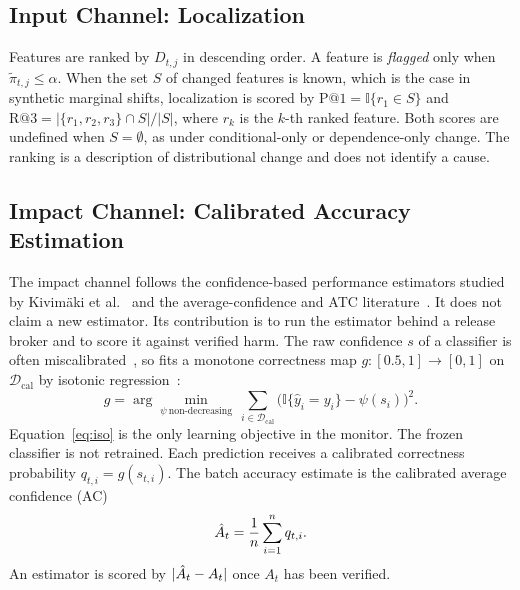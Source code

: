 \subsection{Input Channel: Localization}
Features are ranked by $D_{t,j}$ in descending order. A feature is \emph{flagged}
only when $\tilde{\pi}_{t,j}\le\alpha$. When the set $S$ of changed features is known,
which is the case in synthetic marginal shifts, localization is scored by
$\mathrm{P@1}=\mathbb{I}\{r_1\in S\}$ and
$\mathrm{R@3}=|\{r_1,r_2,r_3\}\cap S|/|S|$, where $r_k$ is the $k$-th ranked
feature. Both scores are undefined when $S=\emptyset$, as under conditional-only or
dependence-only change. The ranking is a description of distributional change and
does not identify a cause.

\subsection{Impact Channel: Calibrated Accuracy Estimation}
\label{sec:impact}
The impact channel follows the confidence-based performance estimators studied by
Kivim\"aki et al.~\cite{kivimaki2025confidence} and the average-confidence and ATC
literature~\cite{garg2022atc,guillory2021predicting}. It does not claim a new
estimator. Its contribution is to run the estimator behind a release broker and to
score it against verified harm. The raw confidence $s$ of a classifier is often
miscalibrated~\cite{guo2017calibration}, so \idm{} fits a monotone correctness map
$g:[0.5,1]\rightarrow[0,1]$ on $\mathcal{D}_{\mathrm{cal}}$ by isotonic
regression~\cite{zadrozny2002transforming}:
\begin{equation}
g=\arg\min_{\psi\ \text{non-decreasing}}\ \sum_{i\in\mathcal{D}_{\mathrm{cal}}}
\bigl(\mathbb{I}\{\hat{y}_i=y_i\}-\psi(s_i)\bigr)^{2}.
\label{eq:iso}
\end{equation}
Equation~\eqref{eq:iso} is the only learning objective in the monitor. The frozen
classifier is not retrained. Each prediction receives a calibrated correctness
probability $q_{t,i}=g(s_{t,i})$. The batch accuracy estimate is the calibrated
average confidence (AC)
\begin{equation}
\hat{A}_t=\frac{1}{n}\sum_{i=1}^{n}q_{t,i}.
\label{eq:ac}
\end{equation}
An estimator is scored by $|\hat{A}_t-A_t|$ once $A_t$ has been verified.

